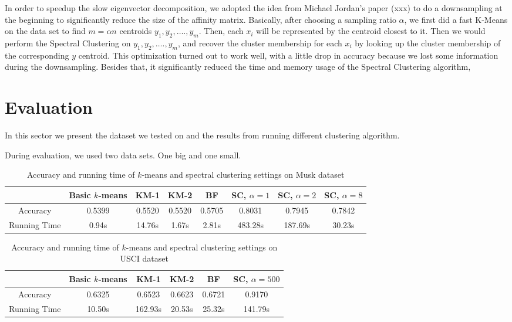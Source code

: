 \documentclass{acm_proc_article-sp}
\begin{document}
In order to speedup the slow eigenvector decomposition, we adopted the idea from Michael Jordan’s paper (xxx) to do a downsampling at the beginning to significantly reduce the size of the affinity matrix. Basically, after choosing a sampling ratio $\alpha$, we first did a fast K-Means on the data set to find $m = \alpha n$ centroids $y_1, y_2, …., y_m$. Then, each $x_i$ will be represented by the centroid closest to it. Then we would perform the Spectral Clustering on $y_1, y_2, …., y_m$, and recover the cluster membership for each $x_i$ by looking up the cluster membership of the corresponding $y$ centroid. This optimization turned out to work well, with a little drop in accuracy because we lost some information during the downsampling. Besides that, it significantly reduced the time and memory usage of the Spectral Clustering algorithm,


\section{Evaluation}


In this sector we present the dataset we tested on and the results from running different clustering algorithm.

During evaluation, we used two data sets. One big and one small.
\\

\begin{table*}
\centering
\begin{tabular}{|c|ccccccc|}
\hline
 & Basic $k$-means & KM-1 & KM-2 & BF & SC, $\alpha=1$ & SC, $\alpha=2$ & SC, $\alpha=8$ \\
 \hline
 Accuracy & 0.5399 & 0.5520 & 0.5520 & 0.5705 & 0.8031 & 0.7945 & 0.7842 \\
 Running Time & 0.94s & 14.76s & 1.67s & 2.81s & 483.28s & 187.69s & 30.23s\\
 \hline
\end{tabular}
\caption{Accuracy and running time of $k$-means and spectral clustering settings on Musk dataset}
\label{table_musk}
\end{table*}

\begin{table*}
\centering
\begin{tabular}{|c|ccccc|}
\hline
 & Basic $k$-means & KM-1 & KM-2 & BF & SC, $\alpha=500$ \\
 \hline
 Accuracy & 0.6325 & 0.6523 & 0.6623 & 0.6721 & 0.9170 \\
 Running Time & 10.50s & 162.93s & 20.53s & 25.32s & 141.79s\\
 \hline
\end{tabular}
\caption{Accuracy and running time of $k$-means and spectral clustering settings on USCI dataset}
\label{table_usci}
\end{table*}
\end{document}
